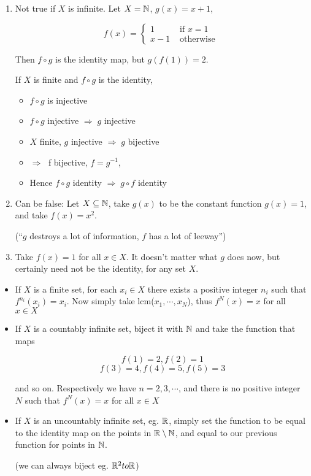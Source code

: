 \documentclass[a4paper]{article}
\begin{document}
\begin{enumerate}
	\item Not true if $ X $ is infinite. Let $ X = \mathbb{N}$, $ g(x) = x + 1 $, 
	
	\[ f(x) = \begin{cases} 1  & \text{ if } x = 1 \\ x - 1 & \text{ otherwise }  \end{cases} \]
	
	Then $ f \circ g $ is the identity map, but $ g(f(1)) = 2 $.
	
	If $ X $ is finite and $ f \circ g $ is the identity, 
	
	\begin{itemize}
		\item $ f \circ g  $ is injective
		\item $ f \circ g  $ injective $ \Rightarrow \; g $ injective 
		\item $ X $ finite, $ g $ injective $ \Rightarrow \; g $ bijective
		\item $ \Rightarrow \; $ f bijective, $ f = g^{-1} $,
		\item Hence $ f \circ g $ identity $ \Rightarrow \; g \circ f $ identity
	\end{itemize}

\item Can be false: Let $ X \subseteq \mathbb{N} $, take $ g(x) $ to be the constant function $ g(x) = 1 $, and take $ f(x) = x^{2} $.

(``$ g $ destroys a lot of information, $ f $ has a lot of leeway'')

\item Take $ f(x) = 1 $ for all $ x \in X $. It doesn't matter what $ g $ does now, but certainly need not be the identity, for any set $ X $. 

	 
\end{enumerate}


\begin{itemize}
	\item If $ X $ is a finite set, for each $ x_{i} \in X $ there exists a positive integer $ n_{i} $ such that $ f^{n_{i}}(x_{i}) = x_{i} $. Now simply take lcm($ x_{1},\cdots,x_{N} $), thus $ f^{N}(x) = x $ for all $ x \in X $
	\item If $ X $ is a countably infinite set, biject it with $ \mathbb{N} $ and take the function that maps
	
	\[ f(1) = 2, f(2) = 1 \]
	\[ f(3) = 4, f(4) = 5, f(5) = 3 \]
	
	and so on. Respectively we have $ n = 2,3,\cdots $, and there is no positive integer $ N $ such that $ f^{N}(x)  = x $ for all $ x \in X $
	
	\item If $ X $ is an uncountably infinite set, eg. $ \mathbb{R} $, simply set the function to be equal to the identity map on the points in $ \mathbb{R} \setminus \mathbb{N} $, and equal to our previous function for points in $ \mathbb{N} $.
	
	(we can always biject eg. $ \mathbb{R}^{2} to \mathbb{R} $)
\end{itemize}
\end{document}
